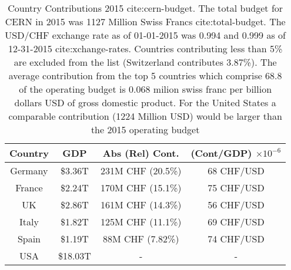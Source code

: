 \begin{center}
\begin{table}[]
\begin{center}
\caption{Country Contributions 2015 cite:cern-budget. 
The total budget for CERN in 2015 was 1127 Million Swiss Francs cite:total-budget. 
The USD/CHF exchange rate as of 01-01-2015 was 0.994 and 0.999 as of 12-31-2015 cite:xchange-rates. 
Countries contributing less than 5\% are excluded from the list (Switzerland contributes 3.87\%). 
The average contribution from the top 5 countries which comprise 68.8 of the operating
 budget is  0.068 milion swiss franc
 per billion dollars USD of gross domestic product. For the United States a comparable
 contribution (1224 Million USD) would be larger than the 2015 operating budget}
\begin{tabular}{cccc}
\textbf{Country} & GDP & Abs (Rel) Cont. & (Cont/GDP) $\times 10^{-6}$ \\
\hline
Germany & \$3.36T  & 231M CHF (20.5\%) & 68 CHF/USD  \\
France  & \$2.24T  & 170M CHF (15.1\%) & 75 CHF/USD\\
UK      & \$2.86T  & 161M CHF (14.3\%) & 56 CHF/USD\\
Italy   & \$1.82T  & 125M CHF (11.1\%) & 69 CHF/USD\\
Spain   & \$1.19T  & 88M  CHF (7.82\%) & 74 CHF/USD\\
\hline
USA     & \$18.03T & -             & -     \\
\end{tabular}
\end{center}
\end{table}
\end{center}
